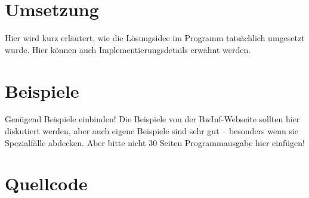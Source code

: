 \documentclass[a4paper,10pt,ngerman]{scrartcl}
\begin{document}
\section{Umsetzung}
Hier wird kurz erläutert, wie die Lösungsidee im Programm tatsächlich umgesetzt
wurde. Hier können auch Implementierungsdetails erwähnt werden.

\section{Beispiele}
Genügend Beispiele einbinden! Die Beispiele von der BwInf-Webseite sollten hier
diskutiert werden, aber auch eigene Beispiele sind sehr gut – besonders wenn
sie Spezialfälle abdecken. Aber bitte nicht 30 Seiten Programmausgabe hier
einfügen!

\section{Quellcode}



\end{document}
